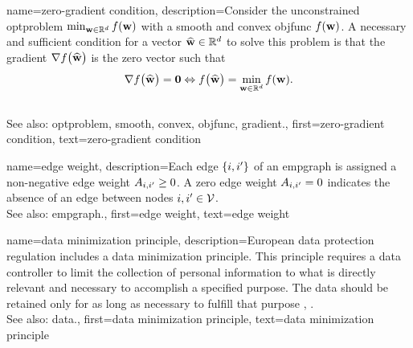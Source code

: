 {name={zero-gradient condition},
	description={Consider the unconstrained 
		\gls{optproblem} $\min_{{\bf w} \in \mathbb{R}^{d}} f({\bf w})$  with 
			a \gls{smooth} and \gls{convex} \gls{objfunc} $f({\bf w})$. A necessary and 
			sufficient condition for a vector $\widehat{{\bf w}} \in \mathbb{R}^{d}$ 
			to solve this problem is that the \gls{gradient} $\nabla f \big( \widehat{{\bf w}} \big)$ 
			is the zero vector such that
			$$ \nabla f \big( \widehat{{\bf w}} \big) = \mathbf{0} \Leftrightarrow  f \big( \widehat{{\bf w}} \big) = \min_{{\bf w} \in \mathbb{R}^{d}} f({\bf w}) .$$ 
					\\
			See also: \gls{optproblem}, \gls{smooth}, \gls{convex}, \gls{objfunc}, \gls{gradient}.}, 
		first={zero-gradient condition},
		text={zero-gradient condition}
}


{name={edge weight},
	description={Each edge $\{i,i'\}$ of an \gls{empgraph} is 
		assigned a non-negative edge weight $A_{i,i'}\geq0$. 
		A zero edge weight $A_{i,i'}=0$ indicates the absence 
		of an edge between nodes $i, i' \in \mathcal{V}$.
				\\
		See also: \gls{empgraph}.}, 
	first={edge weight},
	text={edge weight}
}


{name={data minimization principle},
	description={European \gls{data} protection regulation 
		includes a \gls{data} minimization principle. This principle requires a \gls{data} controller to 
		limit the collection of personal information to what is directly relevant and necessary 
		to accomplish a specified purpose. The \gls{data} should be retained only for as long as 
		necessary to fulfill that purpose \cite[Article 5(1)(c)]{GDPR2016}, \cite{EURegulation2018}.
				\\
		See also: \gls{data}.}, 
	first={data minimization principle},
	text={data minimization principle}
}


